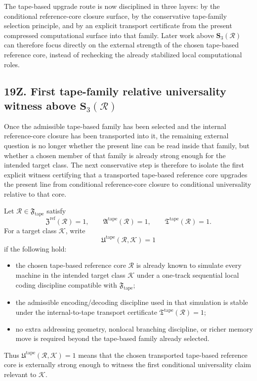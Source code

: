 \begin{corollary}
The tape-based upgrade route is now disciplined in three layers: by the conditional reference-core closure surface, by the conservative tape-family selection principle, and by an explicit transport certificate from the present compressed computational surface into that family. Later work above \(\mathbf S_3(\mathcal R)\) can therefore focus directly on the external strength of the chosen tape-based reference core, instead of rechecking the already stabilized local computational roles.
\end{corollary}


\subsection*{19Z. First tape-family relative universality witness above \(\mathbf S_3(\mathcal R)\)}
Once the admissible tape-based family has been selected and the internal reference-core closure has been transported into it, the remaining external question is no longer whether the present line can be read inside that family, but whether a chosen member of that family is already strong enough for the intended target class. The next conservative step is therefore to isolate the first explicit witness certifying that a transported tape-based reference core upgrades the present line from conditional reference-core closure to conditional universality relative to that core.

\begin{definition}
Let \(\mathcal R\in\mathfrak F_{\mathrm{tape}}\) satisfy
\[
\mathfrak Z^{\mathrm{ref}}(\mathcal R)=1,
\qquad
\mathfrak A^{\mathrm{tape}}(\mathcal R)=1,
\qquad
\mathfrak T^{\mathrm{tape}}(\mathcal R)=1.
\]
For a target class \(\mathcal K\), write
\[
\mathfrak U^{\mathrm{tape}}(\mathcal R,\mathcal K)=1
\]
if the following hold:
\begin{itemize}[leftmargin=2em]
  \item the chosen tape-based reference core \(\mathcal R\) is already known to simulate every machine in the intended target class \(\mathcal K\) under a one-track sequential local coding discipline compatible with \(\mathfrak F_{\mathrm{tape}}\);
  \item the admissible encoding/decoding discipline used in that simulation is stable under the internal-to-tape transport certificate \(\mathfrak T^{\mathrm{tape}}(\mathcal R)=1\);
  \item no extra addressing geometry, nonlocal branching discipline, or richer memory move is required beyond the tape-based family already selected.
\end{itemize}
Thus \(\mathfrak U^{\mathrm{tape}}(\mathcal R,\mathcal K)=1\) means that the chosen transported tape-based reference core is externally strong enough to witness the first conditional universality claim relevant to \(\mathcal K\).
\end{definition}

